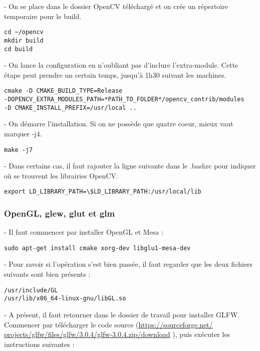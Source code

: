 - On se place dans le dossier OpenCV téléchargé et on crée un répertoire temporaire pour le build.

\begin{verbatim}
cd ~/opencv
mkdir build
cd build
\end{verbatim}

- On lance la configuration en n'oubliant pas d'inclure l'extra-module. Cette étape peut prendre un certain temps, jusqu'à 1h30 suivant les machines.

\begin{verbatim}
cmake -D CMAKE_BUILD_TYPE=Release
-DOPENCV_EXTRA_MODULES_PATH=*PATH_TO_FOLDER*/opencv_contrib/modules
-D CMAKE_INSTALL_PREFIX=/usr/local ..
\end{verbatim}

- On démarre l'installation. Si on ne possède que quatre coeur, mieux vaut marquer -j4.

\begin{verbatim}
make -j7
\end{verbatim}

- Dans certains cas, il faut rajouter la ligne suivante dans le .bashrc pour indiquer où se trouvent les librairies OpenCV.

\begin{verbatim}
export LD_LIBRARY_PATH=\$LD_LIBRARY_PATH:/usr/local/lib
\end{verbatim}


\subsubsection{OpenGL, glew, glut et glm}

- Il faut commencer par installer OpenGL et Mesa :

\begin{verbatim}
sudo apt-get install cmake xorg-dev libglu1-mesa-dev
\end{verbatim}

- Pour savoir si l'opération s'est bien passée, il faut regarder que les deux fichiers suivants sont bien présents :

\begin{verbatim}
/usr/include/GL
/usr/lib/x86_64-linux-gnu/libGL.so
\end{verbatim}

- A présent, il faut retourner dans le dossier de travail pour installer GLFW. Commencer par télécharger le code source (\url{https://sourceforge.net/
projects/glfw/files/glfw/3.0.4/glfw-3.0.4.zip/download} ), puis exécuter les instructions suivantes :

